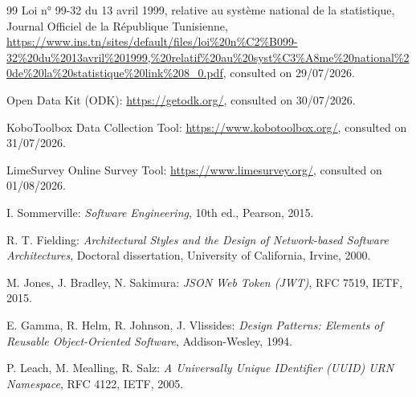 \documentclass[12pt,a4paper]{report}
\begin{document}
\begin{thebibliography}{99}
 Loi n° 99-32 du 13 avril 1999, relative au système national de la statistique, Journal Officiel de la République Tunisienne, \url{https://www.ins.tn/sites/default/files/loi%20n%C2%B099-32%20du%2013avril%201999,%20relatif%20au%20syst%C3%A8me%20national%20de%20la%20statistique%20link%208_0.pdf}, consulted on 29/07/2026.

 Open Data Kit (ODK): \url{https://getodk.org/}, consulted on 30/07/2026.

 KoboToolbox Data Collection Tool: \url{https://www.kobotoolbox.org/}, consulted on 31/07/2026.

 LimeSurvey Online Survey Tool: \url{https://www.limesurvey.org/}, consulted on 01/08/2026.

 I. Sommerville: \textit{Software Engineering}, 10th ed., Pearson, 2015.

 R. T. Fielding: \textit{Architectural Styles and the Design of Network-based Software Architectures}, Doctoral dissertation, University of California, Irvine, 2000.

 M. Jones, J. Bradley, N. Sakimura: \textit{JSON Web Token (JWT)}, RFC 7519, IETF, 2015.

 E. Gamma, R. Helm, R. Johnson, J. Vlissides: \textit{Design Patterns: Elements of Reusable Object-Oriented Software}, Addison-Wesley, 1994.

 P. Leach, M. Mealling, R. Salz: \textit{A Universally Unique IDentifier (UUID) URN Namespace}, RFC 4122, IETF, 2005.

\end{thebibliography}
\end{document}
